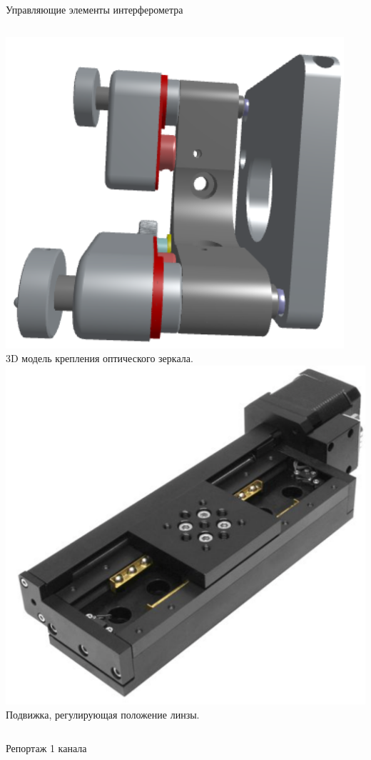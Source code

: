 \begin{frame}{Управляющие элементы интерферометра}
\begin{columns}
\centering
\includegraphics[width=0.7\linewidth]{images/mirror_mount.png}\\
3D модель крепления оптического зеркала.
\centering
\includegraphics[width=0.7\linewidth]{images/lense_mount.png}
Подвижка, регулирующая положение линзы.
\end{columns}
\end{frame}

\begin{frame}{Репортаж 1 канала}
    
\end{frame}

